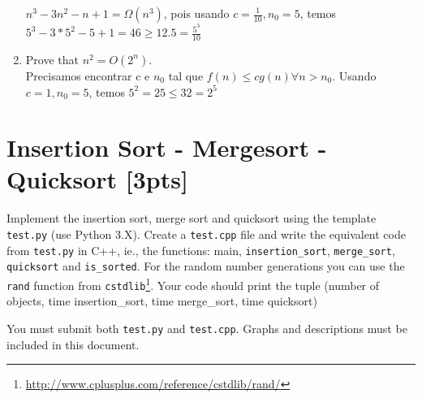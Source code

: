 \documentclass{article}
\begin{document}
\begin{enumerate}[label=\Alph*]
  $n^3 -3n^2 -n+1 = \Omega(n^3)$, pois usando $c = \frac{1}{10}, n_0 = 5$, temos $ 5^3 -3*5^2 -5+1 = 46 \geq 12.5 = \frac{5^3}{10} $
  
  \item Prove that $n^2 = O(2^n)$. \\
  Precisamos encontrar c e $n_0$ tal que $f(n) \leq cg(n) \forall n > n_0$. Usando $c = 1, n_0 = 5$, temos $ 5^2 = 25 \leq 32 = 2^5$
  
\end{enumerate}


\section{Insertion Sort - Mergesort - Quicksort [3pts]}
Implement the insertion sort, merge sort and quicksort using the template \texttt{test.py} (use Python 3.X). Create a \texttt{test.cpp} file and write the equivalent code from \texttt{test.py} in C++, ie., the functions: main, \texttt{insertion\_sort}, \texttt{merge\_sort}, \texttt{quicksort} and \texttt{is\_sorted}. For the random number generations you can use the \texttt{rand} function from \texttt{cstdlib}\footnote{\url{http://www.cplusplus.com/reference/cstdlib/rand/}}. Your code should print the tuple (number of objects, time insertion\_sort, time merge\_sort, time quicksort)

You must submit both \texttt{test.py} and \texttt{test.cpp}. Graphs and descriptions must be included in this document. 
\end{document}
